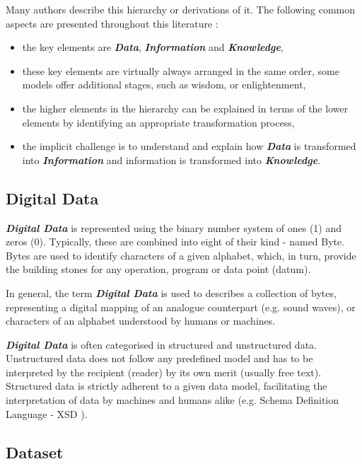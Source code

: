 \documentclass[a4paper,english,twoside,BCOR1.5cm,headsepline,DIV12,appendixprefix,final,12pt]{scrbook}
\newcommand{\important}[1]{\textbf{\textit{#1}}}
\begin{document}
Many authors describe this hierarchy or derivations of it. The following common aspects are presented throughout this literature \cite{Rowley2007}: 

\begin{itemize}
\item the key elements are \important{Data}, \important{Information} and \important{Knowledge},
\item these key elements are virtually always arranged in the same order, some models offer additional stages, such as wisdom, or enlightenment,
\item the higher elements in the hierarchy can be explained in terms of the lower elements by identifying an appropriate transformation process,
\item the implicit challenge is to understand and explain how \important{Data} is transformed into \important{Information} and information is transformed into \important{Knowledge}.
\end{itemize}

\subsection{Digital Data}
\label{sec:digital}
\important{Digital Data} is represented using the binary number system of ones (1) and zeros (0). Typically, these are combined into eight of their kind - named Byte. Bytes are used to identify characters of a given alphabet, which, in turn, provide the building stones for any operation, program or data point (datum).

In general, the term \important{Digital Data} is used to describes a collection of bytes, representing a digital mapping of an analogue counterpart (e.g. sound waves), or characters of an alphabet understood by humans or machines.

\important{Digital Data} is often categorised in structured and unstructured data. Unstructured data does not follow any predefined model and has to be interpreted by the recipient (reader) by its own merit (usually free text). Structured data is strictly adherent to a given data model, facilitating the interpretation of data by machines and humans alike (e.g. Schema Definition Language - XSD \cite{xsd}). 

\subsection{Dataset}
\label{sec:dataset}
\end{document}
